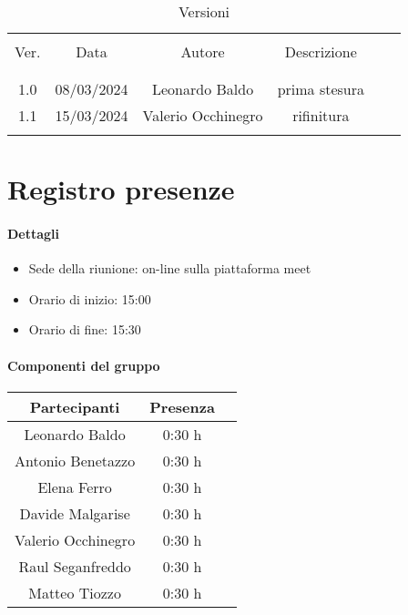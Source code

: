 \documentclass[italian,12pt]{article} %
\begin{document}


\newpage





\begin{table}[!h]
	\caption{Versioni}
	\begin{center}
		\begin{tabular}{ c c c c c c }
			\hline \\[-2ex]
			Ver. & Data & Autore & Descrizione \\
			\\[-2ex] \hline \\[-1.5ex]
			1.0 & 08/03/2024 & Leonardo Baldo& prima stesura \\
			1.1 & 15/03/2024 & Valerio Occhinegro& rifinitura  \\
			\\[-1.5ex] \hline
		\end{tabular}
	\end{center}
\end{table}
\newpage

\tableofcontents

\newpage

\section{Registro presenze}

\paragraph{Dettagli}

\begin{itemize}
	\item Sede della riunione: on-line sulla piattaforma meet
	\item Orario di inizio: 15:00
	\item Orario di fine: 15:30
\end{itemize}

\paragraph{Componenti del gruppo}

\begin{flushleft}
\begin{table}[!h]
\begin{tabular}{ |c|c|c| } 
	\hline
	Partecipanti & Presenza \\
	\hline 
	Leonardo Baldo 		 & 0:30 h \\ 
	Antonio Benetazzo 	 & 0:30 h \\
	Elena Ferro 		 & 0:30 h \\
	Davide Malgarise 	 & 0:30 h \\
	Valerio Occhinegro 	 & 0:30 h \\
	Raul Seganfreddo 	 & 0:30 h \\
	Matteo Tiozzo 		 & 0:30 h \\ 
	\hline
\end{tabular}
\end{table}
\end{flushleft}
\end{document}
